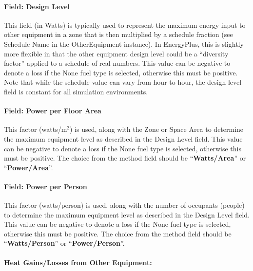 \paragraph{Field: Design Level}\label{field-design-level-4-other-definition}

This field (in Watts) is typically used to represent the maximum energy input to other equipment in a zone that is then multiplied by a schedule fraction (see Schedule Name in the OtherEquipment instance). In EnergyPlus, this is slightly more flexible in that the other equipment design level could be a ``diversity factor'' applied to a schedule of real numbers. This value can be negative to denote a loss if the None fuel type is selected, otherwise this must be positive. Note that while the schedule value can vary from hour to hour, the design level field is constant for all simulation environments.

\paragraph{Field: Power per Floor Area}\label{field-power-per-zone-floor-area-3-other-definition}

This factor (watts/m\(^{2}\)) is used, along with the Zone or Space Area to determine the maximum equipment level as described in the Design Level field. This value can be negative to denote a loss if the None fuel type is selected, otherwise this must be positive. The choice from the method field should be ``\textbf{Watts/Area}'' or ``\textbf{Power/Area}''.

\paragraph{Field: Power per Person}\label{field-power-per-person-3-other-definition}

This factor (watts/person) is used, along with the number of occupants (people) to determine the maximum equipment level as described in the Design Level field. This value can be negative to denote a loss if the None fuel type is selected, otherwise this must be positive. The choice from the method field should be ``\textbf{Watts/Person}'' or ``\textbf{Power/Person}''.

\paragraph{Heat Gains/Losses from Other Equipment:}\label{heat-gainslosses-from-other-equipment-other-definition}

